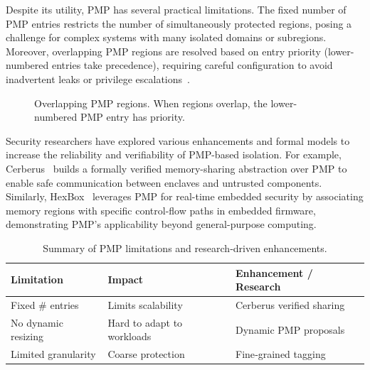 Despite its utility, PMP has several practical limitations. The fixed number of PMP entries restricts the number of simultaneously protected regions, posing a challenge for complex systems with many isolated domains or subregions. Moreover, overlapping PMP regions are resolved based on entry priority (lower-numbered entries take precedence), requiring careful configuration to avoid inadvertent leaks or privilege escalations~\cite{riscvprivspec}.

\begin{figure}[htbp]
\centering
{}
\caption{Overlapping PMP regions. When regions overlap, the lower-numbered PMP entry has priority.}
\label{fig:pmp-priority}
\end{figure}


Security researchers have explored various enhancements and formal models to increase the reliability and verifiability of PMP-based isolation. For example, Cerberus~\cite{cerberus2022} builds a formally verified memory-sharing abstraction over PMP to enable safe communication between enclaves and untrusted components. Similarly, HexBox~\cite{hexbox2018} leverages PMP for real-time embedded security by associating memory regions with specific control-flow paths in embedded firmware, demonstrating PMP's applicability beyond general-purpose computing.

\begin{table}[htbp]
\centering
\renewcommand{\arraystretch}{1.2}
\begin{tabular}{>{\raggedright}p{3cm} >{\raggedright}p{4cm} >{\raggedright\arraybackslash}p{5cm}}
\hline
\textbf{Limitation} & \textbf{Impact} & \textbf{Enhancement / Research} \\
\hline
Fixed \# entries & Limits scalability & Cerberus verified sharing \\
No dynamic resizing & Hard to adapt to workloads & Dynamic PMP proposals \\
Limited granularity & Coarse protection & Fine‑grained tagging \\
\hline
\end{tabular}
\caption{Summary of PMP limitations and research‑driven enhancements.}
\label{tab:pmp-limitations}
\end{table}

